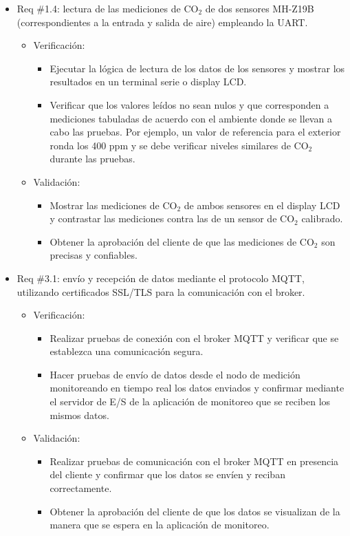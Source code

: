 \documentclass[
11pt, %
]{charter}
\begin{document}
\begin{itemize} 
\item Req \#1.4: lectura de las mediciones de CO$_2$ de dos sensores MH-Z19B (correspondientes a la entrada y salida de aire) empleando la UART.

\begin{itemize}
	\item Verificación: 
        \begin{itemize}
	   \item Ejecutar la lógica de lectura de los datos de los sensores y mostrar los resultados en un terminal serie o display LCD.
	   \item Verificar que los valores leídos no sean nulos y que corresponden a mediciones tabuladas de acuerdo con el ambiente donde se llevan a cabo las pruebas. Por ejemplo, un valor de referencia para el exterior ronda los 400 ppm y se debe verificar niveles similares de CO$_2$ durante las pruebas.
\end{itemize}
	\item Validación: 
        \begin{itemize}
	   \item Mostrar las mediciones de CO$_2$ de ambos sensores en el display LCD y contrastar las mediciones contra las de un sensor de CO$_2$ calibrado.
	   \item Obtener la aprobación del cliente de que las mediciones de CO$_2$ son precisas y confiables.
\end{itemize}
\end{itemize}
\end{itemize}

\begin{itemize} 
\item Req \#3.1: envío y recepción de datos mediante el protocolo MQTT, utilizando certificados SSL/TLS para la comunicación con el broker.

\begin{itemize}
	\item Verificación:  
        \begin{itemize}
	   \item Realizar pruebas de conexión con el broker MQTT y verificar que se establezca una comunicación segura.
	   \item Hacer pruebas de envío de datos desde el nodo de medición monitoreando en tiempo real los datos enviados y confirmar mediante el servidor de E/S de la aplicación de monitoreo que se reciben los mismos datos.
    \end{itemize}
	\item Validación:   
        \begin{itemize}
	   \item Realizar pruebas de comunicación con el broker MQTT en presencia del cliente y confirmar que los datos se envíen y reciban correctamente.
	   \item Obtener la aprobación del cliente de que los datos se visualizan de la manera que se espera en la aplicación de monitoreo.
\end{itemize}
\end{itemize}
\end{itemize}
\end{document}
